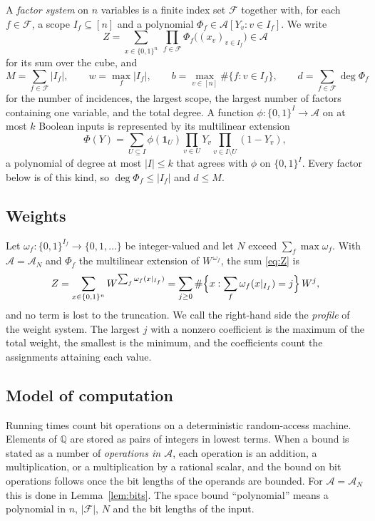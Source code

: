 \documentclass[11pt,reqno]{amsart}
\numberwithin{equation}{section}
\theoremstyle{plain}
\theoremstyle{definition}
\theoremstyle{remark}
\newcommand{\A}{\mathcal{A}}
\newcommand{\F}{\mathcal{F}}
\newcommand{\Q}{\mathbb{Q}}
\begin{document}
A \emph{factor system} on $n$ variables is a finite index set $\F$ together with,
for each $f\in\F$, a scope $I_f\subseteq[n]$ and a polynomial
$\Phi_f\in\A[Y_v:v\in I_f]$. We write
\begin{equation}\label{eq:Z}
  Z=\sum_{x\in\{0,1\}^n}\ \prod_{f\in\F}\Phi_f\bigl((x_v)_{v\in I_f}\bigr)\in\A
\end{equation}
for its sum over the cube, and
\begin{equation}\label{eq:M}
  M=\sum_{f\in\F}|I_f|,\qquad w=\max_f|I_f|,\qquad b=\max_{v\in[n]}\#\{f:v\in I_f\},
  \qquad d=\sum_{f\in\F}\deg\Phi_f
\end{equation}
for the number of incidences, the largest scope, the largest number of factors
containing one variable, and the total degree. A function
$\phi:\{0,1\}^{I}\to\A$ on at most $k$ Boolean inputs is represented by its
multilinear extension
\begin{equation}\label{eq:multilinear}
  \Phi(Y)=\sum_{U\subseteq I}\phi(\mathbf 1_U)\prod_{v\in U}Y_v\prod_{v\in I\setminus U}(1-Y_v),
\end{equation}
a polynomial of degree at most $|I|\le k$ that agrees with $\phi$ on
$\{0,1\}^{I}$. Every factor below is of this kind, so $\deg\Phi_f\le |I_f|$ and
$d\le M$.

\subsection{Weights}
Let $\omega_f:\{0,1\}^{I_f}\to\{0,1,\dots\}$ be integer-valued and let $N$ exceed
$\sum_f\max \omega_f$. With $\A=\A_N$ and $\Phi_f$ the multilinear extension of
$W^{\,\omega_f}$, the sum \eqref{eq:Z} is
\begin{equation}\label{eq:profile}
  Z=\sum_{x\in\{0,1\}^n}W^{\sum_f \omega_f(x|_{I_f})}
   =\sum_{j\ge0}\#\Bigl\{x:\sum_f \omega_f(x|_{I_f})=j\Bigr\}\,W^{j},
\end{equation}
and no term is lost to the truncation. We call the right-hand side the
\emph{profile} of the weight system. The largest $j$ with a nonzero coefficient
is the maximum of the total weight, the smallest is the minimum, and the
coefficients count the assignments attaining each value.

\subsection{Model of computation}
Running times count bit operations on a deterministic random-access machine.
Elements of $\Q$ are stored as pairs of integers in lowest terms. When a bound is
stated as a number of \emph{operations in $\A$}, each operation is an addition,
a multiplication, or a multiplication by a rational scalar, and the bound on bit
operations follows once the bit lengths of the operands are bounded. For
$\A=\A_N$ this is done in Lemma~\ref{lem:bits}. The space bound ``polynomial''
means a polynomial in $n$, $|\F|$, $N$ and the bit lengths of the input.
\end{document}
